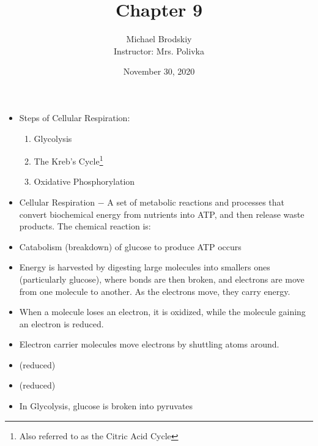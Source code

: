 \documentclass[12pt]{article}
\title{Chapter 9}
\date{November 30, 2020}
\author{Michael Brodskiy\\ \small Instructor: Mrs. Polivka}
\begin{document}
\maketitle

\begin{itemize}

  \item Steps of Cellular Respiration:

    \begin{enumerate}

      \item Glycolysis

      \item The Kreb's Cycle\footnote{Also referred to as the Citric Acid Cycle}

      \item Oxidative Phosphorylation

    \end{enumerate}

  \item Cellular Respiration $-$ A set of metabolic reactions and processes that convert biochemical energy from nutrients into ATP, and then release waste products. The chemical reaction is:    

    \begin{center}
  \end{center}

\item Catabolism (breakdown) of glucose to produce ATP occurs

\item Energy is harvested by digesting large molecules into smallers ones (particularly glucose), where bonds are then broken, and electrons are move from one molecule to another. As the electrons move, they carry energy.

\item When a molecule loses an electron, it is oxidized, while the molecule gaining an electron is reduced.

\item Electron carrier molecules move electrons by shuttling  atoms around.

\item {} (reduced)

\item {} (reduced)

\item In Glycolysis, glucose is broken into pyruvates


\end{itemize}
\end{document}
